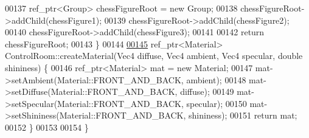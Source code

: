 \begin{DoxyCode}
00137         ref\_ptr<Group> chessFigureRoot = \textcolor{keyword}{new} Group;
00138         chessFigureRoot->addChild(chessFigure1);
00139         chessFigureRoot->addChild(chessFigure2);
00140         chessFigureRoot->addChild(chessFigure3);
00141 
00142         \textcolor{keywordflow}{return} chessFigureRoot;
00143     \}
00144 
\hypertarget{_control_room_8cpp_source_l00145}{}\hyperlink{classbrtr_1_1_control_room_a1cb8b6799fcb85750e0d321a4fbed6f1}{00145}     ref\_ptr<Material> ControlRoom::createMaterial(Vec4 diffuse, Vec4 ambient, Vec4 specular, \textcolor{keywordtype}{double} 
      shininess) \{
00146         ref\_ptr<Material> mat = \textcolor{keyword}{new} Material;
00147         mat->setAmbient(Material::FRONT\_AND\_BACK, ambient);
00148         mat->setDiffuse(Material::FRONT\_AND\_BACK, diffuse);
00149         mat->setSpecular(Material::FRONT\_AND\_BACK, specular);
00150         mat->setShininess(Material::FRONT\_AND\_BACK, shininess);
00151         \textcolor{keywordflow}{return} mat;
00152     \}
00153 
00154 \}
\end{DoxyCode}
